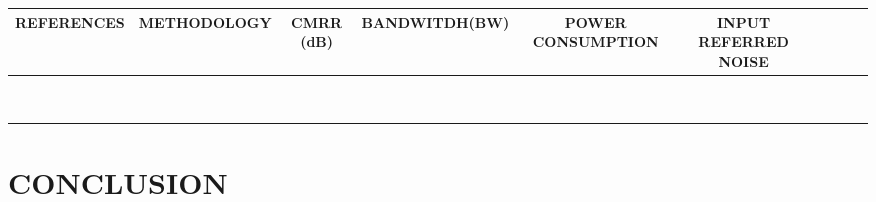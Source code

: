 \documentclass[]{article}
\begin{document}
\begin{tabular}{|c|c|c|c|c|c|c|c|c|c|}
	\hline
	REFERENCES & METHODOLOGY & CMRR (dB) & BANDWITDH(BW) & POWER CONSUMPTION & INPUT REFERRED NOISE &  &  &  &  \\
	\hline
	&  &  &  &  &  &  &  &  &  \\
	\hline
	&  &  &  &  &  &  &  &  &  \\
	\hline
	&  &  &  &  &  &  &  &  &  \\
	\hline
	&  &  &  &  &  &  &  &  &  \\
	\hline
	&  &  &  &  &  &  &  &  &  \\
	\hline
	&  &  &  &  &  &  &  &  &  \\
	\hline
	&  &  &  &  &  &  &  &  &  \\
	\hline
	&  &  &  &  &  &  &  &  &  \\
	\hline
	&  &  &  &  &  &  &  &  &  \\
	\hline
\end{tabular}

\section{CONCLUSION}






	

	

	

	
\end{document}
